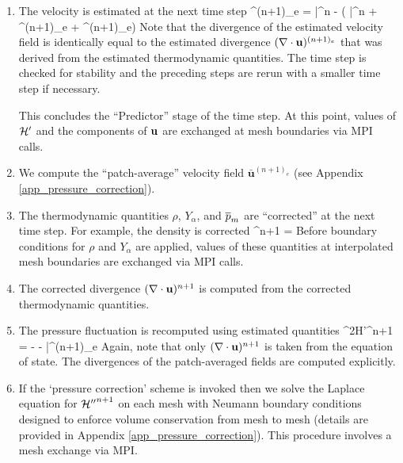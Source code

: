 \documentclass[11pt]{book}
\begin{document}
\begin{enumerate}
\item The velocity is estimated at the next time step
\be
\bu^{(n+1)_e} = \bar{}^n - \dt \left( \bar{\bF}^n + ^{(n+1)_e} + ^{(n+1)_e}\right)
\ee
Note that the divergence of the estimated velocity field is identically equal to the estimated divergence $(\nabla \cdot {\bf u})^{(n+1)_e}$ that was derived from the estimated thermodynamic quantities. The time step is checked for stability and the preceding steps are rerun with a smaller time step if necessary.

This concludes the ``Predictor'' stage of the time step.  At this point, values of $\cal H'$ and the components of ${\bf u}$ are exchanged at mesh boundaries via MPI calls.

\item We compute the ``patch-average'' velocity field $\bar{\mathbf{u}}^{(n+1)_e}$ (see Appendix \ref{app_pressure_correction}).

\item The thermodynamic quantities $\rho$, $Y_\alpha$, and $\overline{p}_m$ are ``corrected'' at the next time step. For example, the density is corrected
\be
\rho^{n+1} = \ha {}
\ee
Before boundary conditions for $\rho$ and $Y_\alpha$ are applied, values of these quantities at
interpolated mesh boundaries are exchanged via MPI calls.

\item The corrected divergence $(\nabla \cdot {\bf u})^{n+1}$ is computed from the
corrected thermodynamic quantities.

\item The pressure fluctuation is recomputed using estimated quantities
\be
\label{eqn_corrector_poisson}
\nabla^2{\cal H'}^{n+1} = -  - \nabla \cdot \bar{}^{(n+1)_e}
\ee
Again, note that only $(\nabla\cdot{\bf u})^{n+1}$ is taken from the equation of state.  The divergences of the patch-averaged fields are computed explicitly.

\item If the `pressure correction' scheme is invoked then we solve the Laplace equation for ${{\cal H}''}^{n+1}$ on each mesh with Neumann boundary conditions designed to enforce volume conservation from mesh to mesh (details are provided in Appendix \ref{app_pressure_correction}).  This procedure involves a mesh exchange via MPI.


\end{enumerate}
\end{document}
